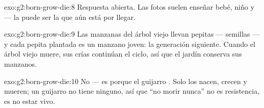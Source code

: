 \begin{solution}{exo:g2:born-grow-die:8}
Respuesta abierta. Las fotos suelen enseñar bebé, niño y  ---
la  puede ser la  que aún está por llegar.
\end{solution}

\begin{solution}{exo:g2:born-grow-die:9}
Las manzanas del árbol viejo llevan pepitas --- semillas --- y cada
pepita plantada es un manzano joven: la generación siguiente. Cuando
el árbol viejo muere, sus crías continúan el ciclo, así que el jardín
conserva sus manzanos.
\end{solution}

\begin{solution}{exo:g2:born-grow-die:10}
No --- es porque el guijarro . Solo los 
nacen, crecen y mueren; un guijarro no tiene  ninguno,
así que ``no morir nunca'' no es resistencia, es no estar vivo.
\end{solution}
